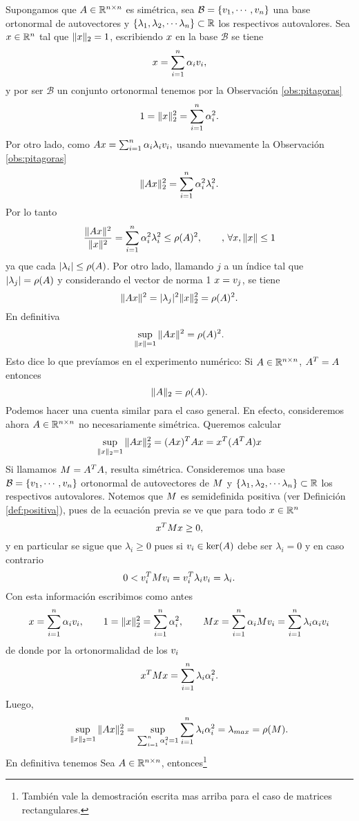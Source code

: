 \etcc
Supongamos que $\Ab\in \Rnn$ es simétrica, sea $\mathcal{B}=\{\vb_1,\cdots,\vb_n\}$ una base ortonormal de autovectores y  $\{\lambda_1, \lambda_2,\cdots \lambda_n\}\subset \mathbb R$ los respectivos autovalores.
Sea $\xb\in\R^n$ tal que $\|\xb\|_2=1$, escribiendo $\xb$ en la base $\mathcal{B}$ se tiene
$$
\xb=\sum_{i=1}^n\alpha_i\vb_i,
$$
y por ser $\mathcal{B}$ un conjunto ortonormal tenemos por la Observación \ref{obs:pitagoras}
$$
1=\|\xb\|_2^2=\sum_{i=1}^n\alpha_i^2.
$$
Por otro lado, como $\Ab\xb=\sum_{i=1}^n\alpha_i\lambda_i\vb_i,
$ usando nuevamente la  Observación \ref{obs:pitagoras}
$$
\|\Ab\xb\|_2^2=\sum_{i=1}^n\alpha_i^2\lambda_i^2.
$$
Por lo tanto
$$
\frac{\|\Ab\xb\|^2}{\|\xb\|^2}=\sum_{i=1}^n\alpha_i^2\lambda_i^2\le \rho(\Ab)^2,\qquad, \, \forall \xb, \|\xb\|\le 1
$$
ya que cada $|\lambda_i|\le \rho(\Ab)$. Por otro lado, llamando $j$ a un índice tal que $|\lambda_j|=\rho(\Ab)$ y considerando el vector de norma 1 $\xb=\vb_j$, se tiene
$$
\|\Ab\xb\|^2=|\lambda_j|^2\|\xb\|_2^2=\rho(\Ab)^2.
$$
En definitiva
$$
\sup_{\|\xb\|=1}\|\Ab\xb\|^2=\rho(\Ab)^2.
$$
Esto dice lo que prevíamos en el experimento numérico:
\tcc
Si  $\Ab\in \Rnn$, $\Ab^T=\Ab$ entonces
$$
\|\Ab\|_2=\rho(\Ab).
$$
\etcc
Podemos hacer una cuenta similar para el caso general. En efecto, consideremos ahora $\Ab\in \R^{n\times n}$ no necesariamente simétrica.
Queremos calcular
$$
\sup_{\|\xb\|_2=1}\|\Ab\xb\|_2^2=(\Ab\xb)^T\Ab\xb=\xb^T(\Ab^T\Ab)\xb
$$
Si llamamos $\Mb=\Ab^T\Ab$, resulta simétrica. Consideremos una base  $\mathcal{B}=\{\vb_1,\cdots,\vb_n\}$  ortonormal de autovectores de $\Mb$ y  $\{\lambda_1, \lambda_2,\cdots \lambda_n\}\subset \mathbb R$ los respectivos autovalores. Notemos que $\Mb$ es semidefinida positiva (ver Definición \ref{def:positiva}), pues de la ecuación previa se ve que para todo $\xb\in \Rn$
$$
\xb^T\Mb\xb\ge 0,
$$
y en particular se sigue que $\lambda_i\ge 0$ pues si $\vb_i\in \ker(\Ab)$ debe ser $\lambda_i=0$ y en caso contrario
$$
0<\vb_i^T\Mb\vb_i=\vb_i^T\lambda_i\vb_i =\lambda_i.
$$
Con esta información escribimos como antes
$$
\xb=\sum_{i=1}^n\alpha_i\vb_i,
\qquad 1=\|\xb\|_2^2=\sum_{i=1}^n\alpha_i^2, \qquad \Mb\xb=\sum_{i=1}^n\alpha_i\Mb\vb_i=\sum_{i=1}^n\lambda_i\alpha_i\vb_i
$$
de donde por la ortonormalidad de los $\vb_i$
$$
\xb^T\Mb\xb=\sum_{i=1}^n\lambda_i\alpha_i^2.
$$
Luego,
$$
\sup_{\|\xb\|_2=1}\|\Ab\xb\|_2^2=\sup_{\sum_{i=1}^n\alpha_i^2=1}\sum_{i=1}^n\lambda_i\alpha_i^2=\lambda_{max}=\rho(\Mb).
$$
En definitiva tenemos
\tcc
Sea $\Ab\in \Rnn$, entonces\footnote{También vale la demostración escrita mas arriba para el caso de matrices rectangulares.}
